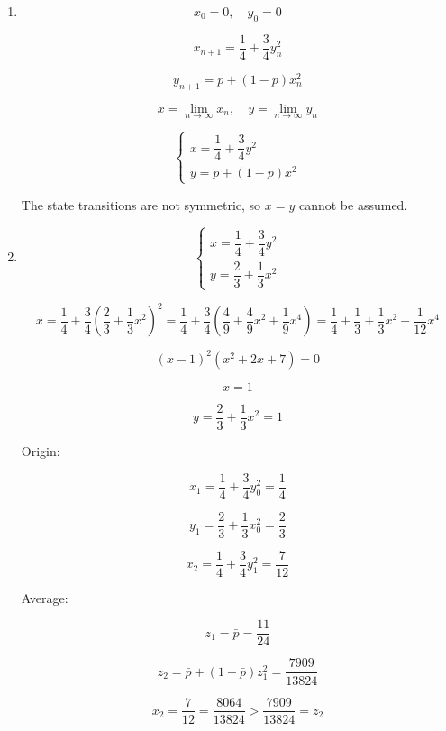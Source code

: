 \documentclass[11pt,a4paper]{article}
\begin{document}
\begin{enumerate}
    \item[(a)]

    $$
    x_0 = 0, \quad y_0 = 0
    $$

    $$
    x_{n+1} = \frac{1}{4} + \frac{3}{4} y_n^2
    $$

    $$
    y_{n+1} = p + (1-p) x_n^2
    $$

    $$
    x = \lim_{n \to \infty} x_n, \quad y = \lim_{n \to \infty} y_n
    $$

    $$
    \begin{cases}
    x = \dfrac{1}{4} + \dfrac{3}{4} y^2 \\
    y = p + (1-p) x^2
    \end{cases}
    $$

    The state transitions are not symmetric, so $x=y$ cannot be assumed.

    \item[(b)]
    
    $$
    \begin{cases}    
    x = \dfrac{1}{4} + \dfrac{3}{4} y^2 \\
    y = \dfrac{2}{3} + \dfrac{1}{3} x^2
    \end{cases}
    $$

    $$
    x
    = \frac{1}{4} + \frac{3}{4} \left(\frac{2}{3} + \frac{1}{3} x^2\right)^2
    = \frac{1}{4} + \frac{3}{4} \left(\frac{4}{9} + \frac{4}{9} x^2 + \frac{1}{9} x^4\right)
    = \frac{1}{4} + \frac{1}{3} + \frac{1}{3} x^2 + \frac{1}{12} x^4
    $$

    $$
    (x - 1)^2 (x^2 + 2x + 7) = 0
    $$

    $$
    x = 1
    $$

    $$
    y = \frac{2}{3} + \frac{1}{3} x^2 = 1
    $$

    Origin:

    $$
    x_1 = \frac{1}{4} + \frac{3}{4} y_0^2 = \frac{1}{4}
    $$

    $$
    y_1 = \frac{2}{3} + \frac{1}{3} x_0^2 = \frac{2}{3}
    $$

    $$
    x_2 = \frac{1}{4} + \frac{3}{4} y_1^2 = \frac{7}{12}
    $$

    Average:

    $$
    z_1 = \bar{p} = \frac{11}{24}
    $$

    $$
    z_2 = \bar{p} + (1-\bar{p}) z_1^2 = \frac{7909}{13824}
    $$

    $$
    x_2 = \frac{7}{12} = \frac{8064}{13824} > \frac{7909}{13824} = z_2
    $$


\end{enumerate}
\end{document}
